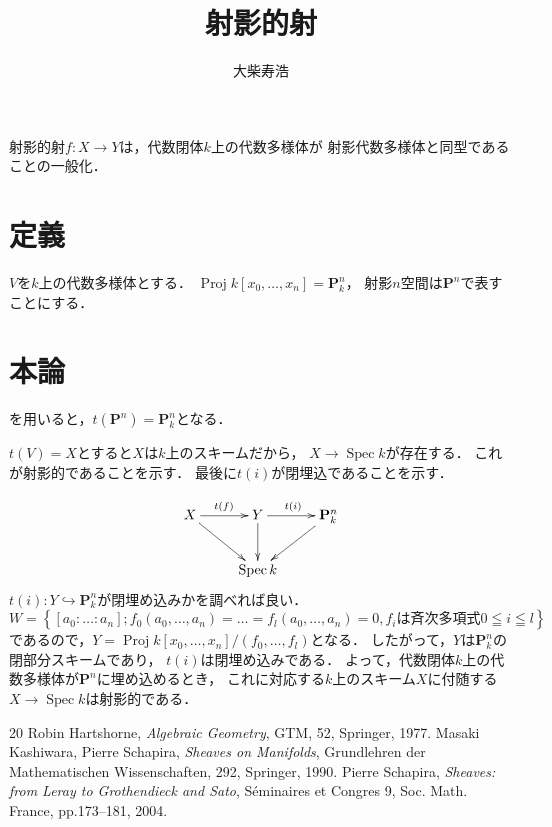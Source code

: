 \documentclass[uplatex,dvipdfmx,b5paper,9pt,draft]{jsarticle}
\title{射影的射}
\author{大柴寿浩}
\theoremstyle{definition}
\newcommand{\pp}{\mathbf{P}}
\numberwithin{equation}{section}
\theoremstyle{mystyle}
\newcommand{\Proj}{\mathop{\mathrm{Proj}}\nolimits}
\newcommand{\Spec}{\mathop{\mathrm{Spec}}\nolimits}
\begin{document}
\maketitle

射影的射\(f\colon X\to Y\)は，代数閉体\(k\)上の代数多様体が
射影代数多様体と同型であることの一般化．

\section{定義}

\(V\)を\(k\)上の代数多様体とする．
\(\Proj{k[x_0,\dots,x_n]}=\pp_{k}^{n}\)，
射影\(n\)空間は\(\pp^n\)で表すことにする．

\section{本論}

\cite[Prop. 2.6]{Ha77}を用いると，\(t(\pp^n)=\pp_{k}^{n}\)となる．

\(t(V)=X\)とすると\(X\)は\(k\)上のスキームだから，
\(X\to\Spec{k}\)が存在する．
これが射影的であることを示す．
最後に\(t(i)\)が閉埋込であることを示す．

\[\xymatrix{
    X\ar[r]^{t(f)}\ar[rd]&
    Y\ar[r]^{t(i)}\ar[d]&
    \pp_{k}^{n}\ar[ld]\\
    &\Spec{k}
}\]
\(t(i)\colon Y\hookrightarrow\pp_{k}^{n}\)が閉埋め込みかを調べれば良い．
\[
    W=\left\{[a_0:\dots:a_n];
    f_0(a_0,\dots,a_n)=\dots=f_l(a_0,\dots,a_n)=0, 
    \text{\(f_i\)は斉次多項式} 0\leqq i\leqq l
    \right\}
\]
であるので，\(Y=\Proj{k[x_0,\dots,x_n]}/(f_0,\dots,f_l)\)となる．
したがって，\(Y\)は\(\pp_{k}^n\)の閉部分スキームであり，
\(t(i)\)は閉埋め込みである．
よって，代数閉体\(k\)上の代数多様体が\(\pp^n\)に埋め込めるとき，
これに対応する\(k\)上のスキーム\(X\)に付随する\(X\to\Spec{k}\)は射影的である．
\begin{thebibliography}{20} 
     Robin Hartshorne, 
      \textit{Algebraic Geometry}, 
      GTM, 52, Springer, 1977.
     Masaki Kashiwara, Pierre Schapira, 
      \textit{Sheaves on Manifolds}, 
      Grundlehren der Mathematischen Wissenschaften, 292, Springer, 1990.
     Pierre Schapira, 
      \textit{Sheaves: from Leray to Grothendieck and Sato}, 
      S\'eminaires et Congres 9, Soc. Math. France, pp.173--181, 2004.
\end{thebibliography}
\end{document}
